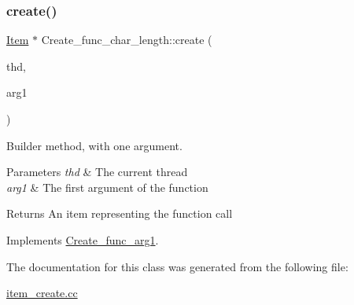 \subsubsection{\texorpdfstring{create()}{create()}}
{\footnotesize\ttfamily \mbox{\hyperlink{classItem}{Item}} $\ast$ Create\+\_\+func\+\_\+char\+\_\+length\+::create (\begin{DoxyParamCaption}\item[{T\+HD $\ast$}]{thd,  }\item[{\mbox{\hyperlink{classItem}{Item}} $\ast$}]{arg1 }\end{DoxyParamCaption})\hspace{0.3cm}{\ttfamily [virtual]}}

Builder method, with one argument. 
\begin{DoxyParams}{Parameters}
{\em thd} & The current thread \\
\hline
{\em arg1} & The first argument of the function \\
\hline
\end{DoxyParams}
\begin{DoxyReturn}{Returns}
An item representing the function call 
\end{DoxyReturn}


Implements \mbox{\hyperlink{classCreate__func__arg1_a3e9a98f755cd82c3e762e334c955a8c9}{Create\+\_\+func\+\_\+arg1}}.



The documentation for this class was generated from the following file\+:\begin{DoxyCompactItemize}
\item 
\mbox{\hyperlink{item__create_8cc}{item\+\_\+create.\+cc}}\end{DoxyCompactItemize}
